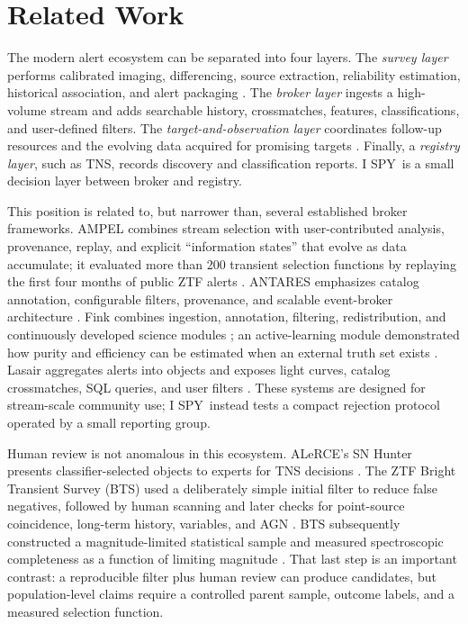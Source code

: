 \documentclass[11pt]{article}
\newcommand{\project}{I SPY}
\begin{document}
\section{Related Work}
\label{sec:related}

The modern alert ecosystem can be separated into four layers. The \emph{survey layer} performs calibrated imaging, differencing, source extraction, reliability estimation, historical association, and alert packaging \citep{masci2019,patterson2019,duev2019}. The \emph{broker layer} ingests a high-volume stream and adds searchable history, crossmatches, features, classifications, and user-defined filters. The \emph{target-and-observation layer} coordinates follow-up resources and the evolving data acquired for promising targets \citep{street2018}. Finally, a \emph{registry layer}, such as TNS, records discovery and classification reports. \project\ is a small decision layer between broker and registry.

This position is related to, but narrower than, several established broker frameworks. AMPEL combines stream selection with user-contributed analysis, provenance, replay, and explicit ``information states'' that evolve as data accumulate; it evaluated more than 200 transient selection functions by replaying the first four months of public ZTF alerts \citep{nordin2019}. ANTARES emphasizes catalog annotation, configurable filters, provenance, and scalable event-broker architecture \citep{matheson2021}. Fink combines ingestion, annotation, filtering, redistribution, and continuously developed science modules \citep{moller2021}; an active-learning module demonstrated how purity and efficiency can be estimated when an external truth set exists \citep{leoni2022}. Lasair aggregates alerts into objects and exposes light curves, catalog crossmatches, SQL queries, and user filters \citep{smith2019}. These systems are designed for stream-scale community use; \project\ instead tests a compact rejection protocol operated by a small reporting group.

Human review is not anomalous in this ecosystem. ALeRCE's SN Hunter presents classifier-selected objects to experts for TNS decisions \citep{carrascodavis2021}. The ZTF Bright Transient Survey (BTS) used a deliberately simple initial filter to reduce false negatives, followed by human scanning and later checks for point-source coincidence, long-term history, variables, and AGN \citep{fremling2020}. BTS subsequently constructed a magnitude-limited statistical sample and measured spectroscopic completeness as a function of limiting magnitude \citep{perley2020}. That last step is an important contrast: a reproducible filter plus human review can produce candidates, but population-level claims require a controlled parent sample, outcome labels, and a measured selection function.
\end{document}
